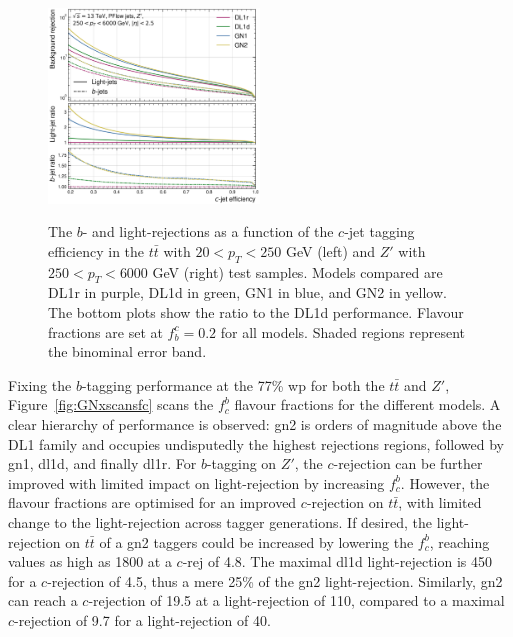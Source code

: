 \begin{center}
\begin{figure}[h!]
{  \includegraphics[width=0.50\textwidth]{Images/FTAG/GN/GN2/rocs/roc_zp_c.png}
  }
  \caption{The $b$- and light-rejections as a function of the $c$-jet tagging efficiency in the $t\bar{t}$ with $20 < p_T < 250$ GeV (left) and $Z'$ with $250 < p_T < 6000$ GeV (right) test samples. Models compared are DL1r in purple, DL1d in green, GN1 in blue, and GN2 in yellow. The bottom plots show the ratio to the DL1d performance. Flavour fractions are set at $f^c_b = 0.2$ for all models. Shaded regions represent the binominal error band.}
  \label{fig:GN2rocc}
  \end{figure}
\end{center}

Fixing the $b$-tagging performance at the 77\% \gls{wp} for both the $t\bar{t}$ and $Z'$, Figure~\ref{fig:GNxscansfc} scans the $f^b_c$ flavour fractions for the different models. A clear hierarchy of performance is observed: \gls{gn2} is orders of magnitude above the DL1 family and occupies undisputedly the highest rejections regions, followed by \gls{gn1}, \gls{dl1d}, and finally \gls{dl1r}. For $b$-tagging on $Z'$, the $c$-rejection can be further improved with limited impact on light-rejection by increasing $f^b_c$. However, the flavour fractions are optimised for an improved $c$-rejection on $t\bar{t}$, with limited change to the light-rejection across tagger generations. If desired, the light-rejection on $t\bar{t}$ of a \gls{gn2} taggers could be increased by lowering the $f^b_c$, reaching values as high as 1800 at a $c$-rej of 4.8. The maximal \gls{dl1d} light-rejection is 450 for a $c$-rejection of 4.5, thus a mere 25\% of the \gls{gn2} light-rejection. Similarly, \gls{gn2} can reach a $c$-rejection of 19.5 at a light-rejection of 110, compared to a maximal $c$-rejection of 9.7 for a light-rejection of 40. \\

